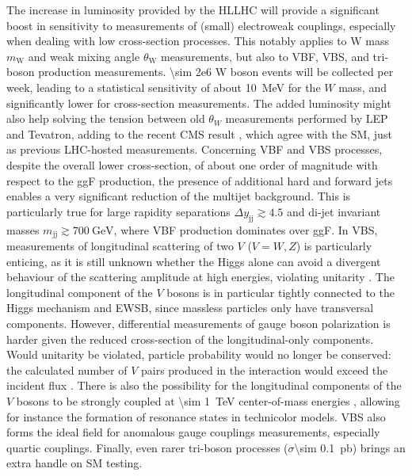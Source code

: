 \documentclass[11pt]{article}
\newcommand{\dijetmass}{m_{\text{jj}}}
\newcommand{\dijetrap}{y_{\text{jj}}}
\newcommand{\mw}{m_{\text{W}}}
\newcommand{\thw}{\theta_{\text{W}}}
\begin{document}
The increase in luminosity provided by the \ac{HLLHC} will provide a significant boost in sensitivity to measurements of (small) electroweak couplings, especially when dealing with low cross-section processes.
This notably applies to W mass \(\mw\) and weak mixing angle \(\thw\) measurements, but also to \ac{VBF}, \ac{VBS}, and tri-boson production measurements.
\num{\sim 2e6} W boson events will be collected per week, leading to a statistical sensitivity of about \SI{10}{\MeV} for the \(W\) mass, and significantly lower for cross-section measurements.
The added luminosity might also help solving the tension between old \(\theta_{W}\) measurements performed by \ac{LEP} and Tevatron, adding to the recent \ac{CMS} result \cite{weak_mixing_angle_cms}, which agree with the \ac{SM}, just as previous \ac{LHC}-hosted measurements.
Concerning \ac{VBF} and \ac{VBS} processes, despite the overall lower cross-section, of about one order of magnitude with respect to the \ac{ggF} production, the presence of additional hard and forward jets enables a very significant reduction of the multijet background.
This is particularly true for large rapidity separations \(\Delta \dijetrap \gtrsim 4.5\) and di-jet invariant masses
\(\dijetmass \gtrsim \SI{700}{\GeV}\), where \ac{VBF} production dominates over \ac{ggF}.
In \ac{VBS}, measurements of longitudinal scattering of two \(V\) (\(V=W,Z\)) is particularly enticing, as it is still unknown whether the Higgs alone can avoid a divergent behaviour of the scattering amplitude at high energies, violating unitarity \cite{vbs2}.
The longitudinal component of the \(V\) bosons is in particular tightly connected to the Higgs mechanism and \ac{EWSB}, since massless particles only have transversal components.
However, differential measurements of gauge boson polarization is harder given the reduced cross-section of the longitudinal-only components.
Would unitarity be violated, particle probability would no longer be conserved: the calculated number of \(V\) pairs produced in the interaction would exceed the incident flux \cite{thomson}.
There is also the possibility for the longitudinal components of the \(V\) bosons to be strongly coupled at \SI{\sim 1}{\TeV} center-of-mass energies \cite{vbs1}, allowing for instance the formation of resonance states in technicolor models.
\ac{VBS} also forms the ideal field for anomalous gauge couplings measurements, especially quartic couplings.
Finally, even rarer tri-boson processes (\(\sigma\)\SI{\sim 0.1}{\pico\barn}) brings an extra handle on \ac{SM} testing.
\end{document}
